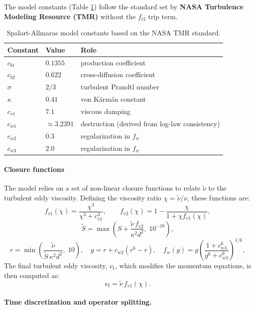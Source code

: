 The model constants (Table \ref{tab:sa_constants}) follow the standard set by \textbf{NASA Turbulence Modeling Resource (TMR)} without the $f_{t2}$ trip term.

\begin{table}[h!]
  \centering
  \caption{Spalart-Allmaras model constants based on the NASA TMR standard.}
  \label{tab:sa_constants}
  \begin{tabular}{lll}
    \hline
    Constant & Value & Role \\
    \hline
    $c_{b1}$ & $0.1355$ & production coefficient \\
    $c_{b2}$ & $0.622$  & cross-diffusion coefficient \\
    $\sigma$  & $2/3$    & turbulent Prandtl number \\
    $\kappa$  & $0.41$   & von K\'arm\'an constant \\
    $c_{v1}$ & $7.1$    & viscous damping \\
    $c_{w1}$ & $\approx 3.2391$ & destruction (derived from log-law consistency) \\
    $c_{w2}$ & $0.3$    & regularization in $f_w$ \\
    $c_{w3}$ & $2.0$    & regularization in $f_w$ \\
    \hline
  \end{tabular}
\end{table}

\paragraph{Closure functions}

The model relies on a set of non-linear closure functions to relate $\tilde{\nu}$ to the turbulent eddy viscosity. Defining the viscosity ratio $\chi = \tilde{\nu}/\nu$, these functions are:
\[
  f_{v1}(\chi) = \frac{\chi^3}{\chi^3 + c_{v1}^3}, \qquad
  f_{v2}(\chi) = 1 - \frac{\chi}{1 + \chi f_{v1}(\chi)},
\]
\[
  \tilde{S} = \max\!\left(S + \frac{\tilde{\nu}\,f_{v2}}{\kappa^2 d^2},\;
  10^{-10}\right),
\]
\[
  r = \min\!\left(\frac{\tilde{\nu}}{\tilde{S}\,\kappa^2 d^2},\; 10\right),
  \quad
  g = r + c_{w2}(r^6 - r),
  \quad
  f_w(g) = g\left(\frac{1+c_{w3}^6}{g^6+c_{w3}^6}\right)^{1/6},
\]
The final turbulent eddy viscosity, $\nu_t$, which modifies the momentum equations, is then computed as:
\[
  \nu_t = \tilde{\nu}\,f_{v1}(\chi).
\]

\paragraph{Time discretization and operator splitting.}

